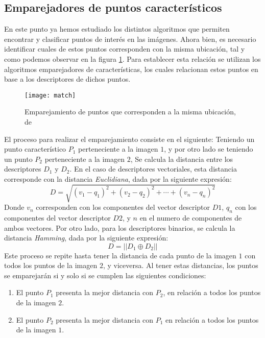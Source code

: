 \subsection{Emparejadores de puntos característicos}

En este punto ya hemos estudiado los distintos algoritmos que permiten encontrar y clasificar puntos de interés en las imágenes. Ahora bien, es necesario identificar cuales de estos puntos corresponden con la misma ubicación, tal y como podemos observar en la figura \ref*{imagen:match}. Para establecer esta relación se utilizan los algoritmos emparejadores de características, los cuales relacionan estos puntos en base a los descriptores de dichos puntos.

\begin{figure}[H]
	\centering
	\texttt{[image: match]}
	\caption[Emparejamiento de puntos característicos]{Emparejamiento de puntos que corresponden a la misma ubicación, de \cite{comp-vision} }
	\label{imagen:match}
\end{figure}

El proceso para realizar el emparejamiento consiste en el siguiente: Teniendo un punto característico $P_{1}$ perteneciente a la imagen $1$, y por otro lado se teniendo un punto $P_{2}$ perteneciente a la imagen $2$, Se calcula la distancia entre los descriptores $D_{1}$ y $D_{2}$. En el caso de descriptores vectoriales, esta distancia corresponde con la distancia \textit{Euclidiana}, dada por la siguiente expresión:
\begin{displaymath}
D = \sqrt{ (v_{1}-q_{1})^2 + (v_{2}-q_{2})^2 + \cdots + (v_{n}-q_{n})^2 }
\end{displaymath}
Donde $v_{n}$ corresponden con los componentes del vector descriptor $D1$, $q_{n}$ con los componentes del vector descriptor $D2$, y $n$ en el numero de componentes de ambos vectores. Por otro lado, para los descriptores binarios, se calcula la distancia \textit{Hamming}, dada por la siguiente expresión:
\begin{displaymath}
D = ||D_{1} \oplus D_{2}||
\end{displaymath}
Este proceso se repite hasta tener la distancia de cada punto de la imagen $1$ con todos los puntos de la imagen $2$, y viceversa. Al tener estas distancias, los puntos se emparejarán si y solo si se cumplen las siguientes condiciones: 

\begin{enumerate}[label=(\roman*)]
	\item El punto $P_{1}$ presenta la mejor distancia con $P_{2}$, en relación a todos los puntos de la imagen $2$.
	
	\item El punto $P_{2}$ presenta la mejor distancia con $P_{1}$ en relación a todos los puntos de la imagen $1$.
\end{enumerate}

